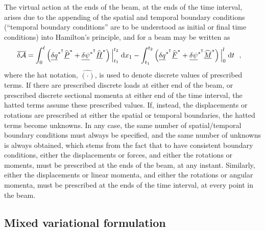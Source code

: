 \documentclass[12pt,a4paper,oneside,english]{abntex2} %
\newcommand{\vect}[1]{\underline{#1}}
\def\lp{\left(}
\def\rp{\right)}
\def\T{\mathsf{T}}
\def\xo{x_1}
\def\P{\vect{P}}
\def\Phats{\widehat{\P}^*}
\def\Hv{\vect{H}}
\def\Hhats{\widehat{\Hv}^*}
\def\F{\vect{F}}
\def\Fhat{\widehat{\F}}
\def\Fhats{\Fhat^*}
\def\M{\vect{M}}
\def\Mhat{\widehat{\M}}
\def\Mhats{\Mhat^*}
\def\delq{\vect{\delta q}}
\def\delqsT{\delq^{*^\T}}
\def\delpsi{\vect{\delta\psi}}
\def\delpsisT{\delpsi^{*^\T}}
\def\intt{\int_{t_1}^{t_2}}
\def\intl{\int_{0}^{\ell}}
\def\d{\textnormal{d}}
\def\deltaA{\overline{\delta\mathcal{A}}}
\begin{document}
The virtual action at the ends of the beam, at the ends of the time interval, arises due to the appending of the spatial and temporal boundary conditions (``temporal boundary conditions'' are to be understood as initial or final time conditions) into Hamilton's principle, and for a beam may be written as 
\begin{align}                                 \deltaA &= 
    \intl\lp \delqsT\Phats + \delpsisT\Hhats \rp\Big|_{t_1}^{t_2} \; \d \xo - \intt\lp  \delqsT\Fhats + \delpsisT\Mhats \rp\Big|_{0}^{l} \; \d t \ \ ,
    \label{eq:deltaA} 
\end{align} 
where the hat notation, $\widehat{(\cdot)}$, is used to denote discrete values of prescribed terms. If there are prescribed discrete loads at either end of the beam, or prescribed discrete sectional momenta at either end of the time interval, the hatted terms assume these prescribed values. If, instead, the displacements or rotations are prescribed at either the spatial or temporal boundaries, the hatted terms become unknowns. In any case, the same number of spatial/temporal boundary conditions must always be specified, and the same number of unknowns is always obtained, which stems from the fact that to have consistent boundary conditions, either the displacements or forces, and either the rotations or moments, must be prescribed at the ends of the beam, at any instant. Similarly, either the displacements or linear momenta, and either the rotations or angular momenta, must be prescribed at the ends of the time interval, at every point in the beam.

\subsection{Mixed variational formulation}
\end{document}
